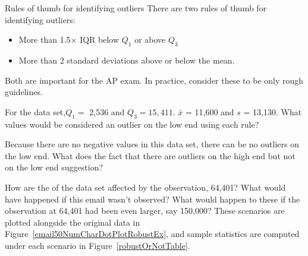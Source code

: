 \begin{onebox}{Rules of thumb for identifying outliers}
There are two rules of thumb for identifying outliers:
\begin{itemize}
\setlength{\itemsep}{0mm}
\item More than 1.5$\times$ IQR below $Q_1$ or above $Q_3$
\item More than 2 standard deviations above or below the mean.
\end{itemize}
Both are important for the AP exam. In practice, consider these to be only rough guidelines.\end{onebox}

\begin{exercisewrap}
\begin{nexercise}For the  data set,$Q_1=$ 2,536 and $Q_3=15,411$. $\bar{x}$ = 11,600  and $s$ = 13,130. What values would be considered an outlier on the low end using each rule?\footnotemark
\end{nexercise}
\end{exercisewrap}


\begin{exercisewrap}
\begin{nexercise} Because there are no negative values in this data set, there can be no outliers on the low end. What does the fact that there are outliers on the high end but not on the low end suggestion?\footnotemark
\end{nexercise}
\end{exercisewrap}

How are the  of the  data set affected by the observation, 64,401? What would have happened if this email wasn't observed? What would happen to these  if the observation at 64,401 had been even larger, say 150,000? These scenarios are plotted alongside the original data in Figure~\ref{email50NumCharDotPlotRobustEx}, and sample statistics are computed under each scenario in Figure~\ref{robustOrNotTable}.

